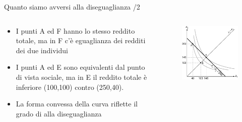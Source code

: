 \documentclass[11pt]{beamer}
\begin{document}
\begin{frame}{Quanto siamo avversi alla diseguaglianza /2}
\begin{columns}
\begin{column}{.5\columnwidth}
\begin{itemize}
\item I punti A ed F hanno lo stesso reddito totale, ma in F c'è eguaglianza dei
redditi dei due individui
\item I punti A ed E sono equivalenti dal punto di vista sociale, ma in E il
reddito totale è inferiore (100,100) contro (250,40).
\item La forma convessa della curva riflette il grado di alla diseguaglianza
\end{itemize}
\end{column}

\begin{column}{.5\columnwidth}
\begin{figure}[htbp]
\centering
\includegraphics[width=\textwidth]{./figure/fbs-4.pdf}
\end{figure}
\end{column}
\end{columns}
\end{frame}
\end{document}
